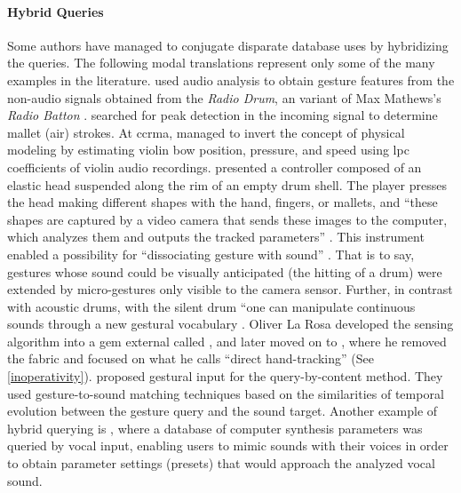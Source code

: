 \documentclass[
]{book}
\newcommand{\see}[1]{(See \ref{#1})}
\newcommand{\obj}[1]{\framebox{{\small\textbf{\texttt{#1}}}}}
\begin{document}
\paragraph{Hybrid Queries}
\label{applications:hybrid_queries}
Some authors have managed to conjugate disparate database uses by hybridizing the queries. The following modal translations represent only some of the many examples in the literature. \textcite{icmc/bbp2372.2001.103} used audio analysis to obtain gesture features from the non-audio signals obtained from the \textit{Radio Drum}, an variant of Max Mathews's \textit{Radio Batton} \parencite{DBLP:conf/icmc/Boie89}. \textcite{icmc/bbp2372.2001.103} searched for peak detection in the incoming signal to determine mallet (air) strokes. At \gls{ccrma}, \textcite{icmc/bbp2372.2001.071} managed to invert the concept of physical modeling by estimating violin bow position, pressure, and speed using \gls{lpc} coefficients of violin audio recordings. \textcite{DBLP:conf/icmc/OliverJ08} presented a controller composed of an elastic head suspended along the rim of an empty drum shell. The player presses the head making different shapes with the hand, fingers, or mallets, and ``these shapes are captured by a video camera that sends these images to the computer, which analyzes them and outputs the tracked parameters'' \parencite[1]{DBLP:conf/icmc/OliverJ08}. This instrument enabled a possibility for ``dissociating gesture with sound'' \parencite[1]{DBLP:conf/icmc/OliverJ08}. That is to say, gestures whose sound could be visually anticipated (the hitting of a drum) were extended by micro-gestures only visible to the camera sensor. Further, in contrast with acoustic drums, with the silent drum ``one can manipulate continuous sounds through a new gestural vocabulary \parencite[1]{DBLP:conf/icmc/OliverJ08}. Oliver La Rosa developed the sensing algorithm into a \gls{gem} external called \obj{pix\_drum}, and later moved on to \obj{pix\_mano}, where he removed the fabric and focused on what he calls ``direct hand-tracking'' \parencite{DBLP:conf/icmc/OliverJ10} \see{inoperativity}. \textcite{Caramiaux2011} proposed gestural input for the query-by-content method. They used gesture-to-sound matching techniques based on the similarities of temporal evolution between the gesture query and the sound target. Another example of hybrid querying is \textcite{mcartwright:2014}, where a database of computer synthesis parameters was queried by vocal input, enabling users to mimic sounds with their voices in order to obtain parameter settings (presets) that would approach the analyzed vocal sound.	
\end{document}
